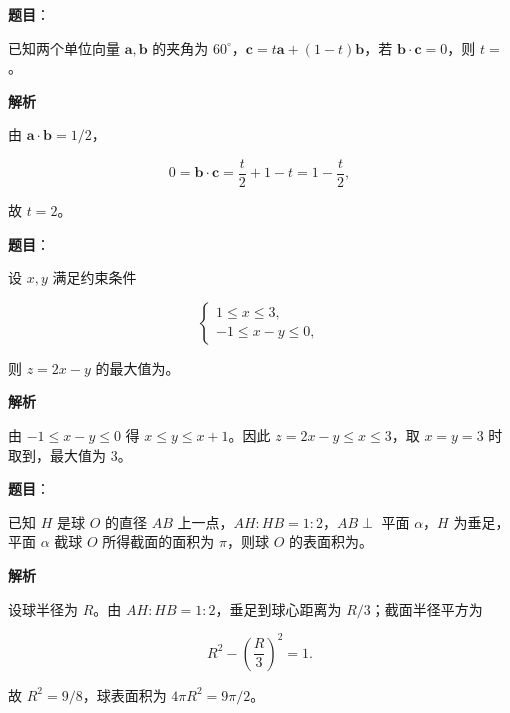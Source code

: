 \begin{answer}

\textbf{题目}：

已知两个单位向量 $\boldsymbol a,\boldsymbol b$ 的夹角为 $60^\circ$，$\boldsymbol c=t\boldsymbol a+(1-t)\boldsymbol b$，若 $\boldsymbol b\cdot\boldsymbol c=0$，则 $t=$\gkblank{}。

\textbf{解析}

由 $\boldsymbol a\cdot\boldsymbol b=1/2$，

\nopagebreak[4]
\[
0=\boldsymbol b\cdot\boldsymbol c=\frac t2+1-t=1-\frac t2,
\]

故 $t=2$。


\end{answer}
\begin{answer}

\textbf{题目}：

设 $x,y$ 满足约束条件

\nopagebreak[4]
\[
\begin{cases}
1\leqslant x\leqslant3,\\
-1\leqslant x-y\leqslant0,
\end{cases}
\]

则 $z=2x-y$ 的最大值为\gkblank{}。

\textbf{解析}

由 $-1\leqslant x-y\leqslant0$ 得 $x\leqslant y\leqslant x+1$。因此 $z=2x-y\leqslant x\leqslant3$，取 $x=y=3$ 时取到，最大值为 $3$。


\end{answer}
\begin{answer}

\textbf{题目}：

已知 $H$ 是球 $O$ 的直径 $AB$ 上一点，$AH:HB=1:2$，$AB\perp$ 平面 $\alpha$，$H$ 为垂足，平面 $\alpha$ 截球 $O$ 所得截面的面积为 $\pi$，则球 $O$ 的表面积为\gkblank{}。

\textbf{解析}

设球半径为 $R$。由 $AH:HB=1:2$，垂足到球心距离为 $R/3$；截面半径平方为

\nopagebreak[4]
\[
R^2-\left(\frac R3\right)^2=1.
\]

故 $R^2=9/8$，球表面积为 $4\pi R^2=9\pi/2$。


\end{answer}
